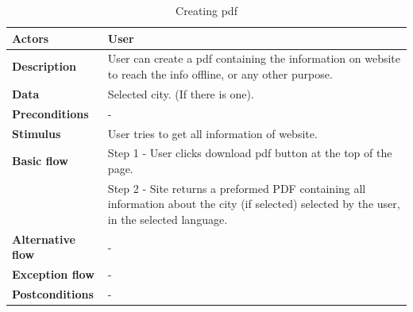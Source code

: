 \begin{center}
\begin{table}[H]
\begin{tabular}{| m{3cm}| m{10cm} |}
            \hline
            \textbf{Actors}           & User                                                                                                                                          \\
            \hline
            \textbf{Description}      & User can create a pdf containing the information on website to reach the info offline, or any other purpose.                                  \\
            \hline
            \textbf{Data}             & Selected city. (If there is one).                                                                                                             \\
            \hline
            \textbf{Preconditions}    & -                                                                                                                                             \\
            \hline
            \textbf{Stimulus}         & User tries to get all information of website.                                                                                                 \\
            \hline
            \textbf{Basic flow}       & Step 1 - User clicks download pdf button at the top of the page.                                                                              \\
                                      & Step 2 - Site returns a preformed PDF containing all information about the city (if selected) selected by the user, in the selected language. \\
            \hline
            \textbf{Alternative flow} & -                                                                                                                                             \\
            \hline
            \textbf{Exception flow}   & -                                                                                                                                             \\
            \hline
            \textbf{Postconditions}   & -                                                                                                                                             \\
            \hline
        \end{tabular}
        \caption[Creating pdf]{Creating pdf}
    \end{table}


\end{center}
